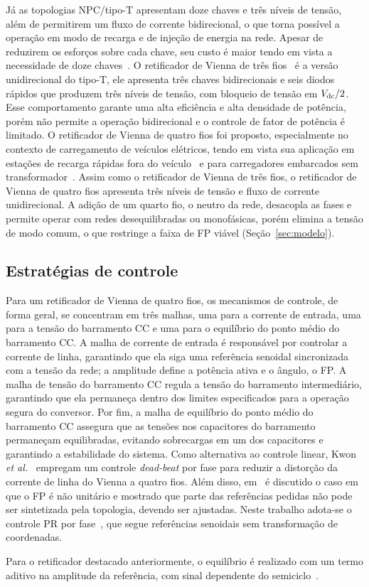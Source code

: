 Já as topologias NPC/tipo-T apresentam doze chaves e três níveis de tensão, além de permitirem um fluxo de corrente
bidirecional, o que torna possível a operação em modo de recarga e de injeção de energia na rede. Apesar de reduzirem os esforços sobre cada chave, seu custo é maior
tendo em vista a necessidade de doze chaves~\cite{safayatullah2022comprehensive}. O retificador de Vienna de três fios~\cite{kolar1997novel} é a versão unidirecional do 
tipo-T, ele apresenta três chaves bidirecionais e seis diodos rápidos que produzem três níveis de tensão, com bloqueio de tensão em $V_{\mathrm{dc}}/2$. Esse comportamento garante uma alta eficiência e alta densidade de potência, porém não permite a operação bidirecional 
e o controle de fator de potência é limitado. O retificador de Vienna de quatro fios foi proposto, especialmente no contexto de carregamento de veículos elétricos, tendo em vista sua aplicação em estações de recarga rápidas fora do veículo~\cite{senthilkumar2025iipq} e
para carregadores embarcados sem transformador~\cite{schafmeister2021transformerless}. Assim como o retificador de Vienna de três fios, o retificador de Vienna de quatro fios apresenta três níveis de tensão e fluxo de corrente unidirecional. A adição de um quarto fio, o neutro da rede, desacopla as fases e permite operar com redes desequilibradas ou monofásicas, porém elimina a tensão de modo comum, o que restringe a faixa de FP viável (Seção~\ref{sec:modelo}).

\subsection{Estratégias de controle}

Para um retificador de Vienna de quatro fios, os mecanismos de controle, de forma geral, se concentram em três malhas, uma para a corrente de entrada,
uma para a tensão do barramento CC e uma para o equilíbrio do ponto médio do barramento CC. A malha de corrente de entrada é responsável por controlar a corrente de linha, garantindo que ela siga uma referência senoidal sincronizada com a tensão da rede; a amplitude define a potência ativa e o ângulo, o FP. A malha de tensão do barramento CC regula a tensão do barramento intermediário, garantindo que ela permaneça dentro dos limites especificados para a operação segura do conversor. Por fim, a malha de equilíbrio do ponto médio do barramento CC assegura que as tensões nos capacitores do barramento permaneçam equilibradas, evitando sobrecargas em um dos capacitores e garantindo a estabilidade do sistema.
Como alternativa ao controle linear, Kwon \textit{et al.}~\cite{kwon2017line} empregam um controle \textit{dead-beat} por fase para reduzir a distorção da corrente de linha do Vienna a quatro fios. Além disso, em~\cite{liao2026nonunity} é discutido o caso em que o FP é não unitário e mostrado que parte das referências pedidas não pode ser sintetizada pela topologia, devendo ser ajustadas. Neste trabalho adota-se o controle PR por fase~\cite{alonso2018distributed}, que segue referências senoidais sem transformação de coordenadas.

Para o retificador destacado anteriormente, o equilíbrio é realizado com um termo aditivo na amplitude da referência, com sinal dependente do semiciclo~\cite{alahuhtala2006fourwire}.

